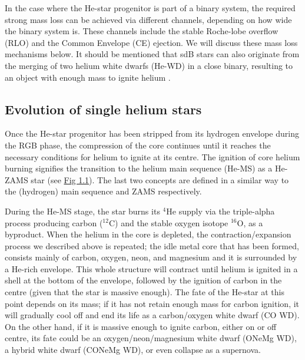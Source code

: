 \documentclass[../../main/thesis_msc.tex]{subfiles}
\begin{document}
				In the case where the He-star progenitor is part of a binary system, the required strong mass loss can be achieved via different channels, depending on how wide the binary system is. These channels include the stable Roche-lobe overflow (RLO) and the Common Envelope (CE) ejection. We will discuss these mass loss mechanisms below.
				It should be mentioned that sdB stars can also originate from the merging of two helium white dwarfs (He-WD) in a close binary, resulting to an object with enough mass to ignite helium \citep{Han2002}.
				
				
			
			\subsection{Evolution of single helium stars}
			
				Once the He-star progenitor has been stripped from its hydrogen envelope during the RGB phase, the compression of the core continues until it reaches the necessary conditions for helium to ignite at its centre. The ignition of core helium burning signifies the transition to the helium main sequence (He-MS) as a He-ZAMS star (see \hyperref[fig:T_rho_plane_ch1]{Fig 1.1}). The last two concepts are defined in a similar way to the (hydrogen) main sequence and ZAMS respectively.
				
				During the He-MS stage, the star burns its $^4$He supply via the triple-alpha process producing carbon ($^{12}$C) and the stable oxygen isotope $^{16}$O, as a byproduct. When the helium in the core is depleted, the contraction/expansion process we described above is repeated; the idle metal core that has been formed, consists mainly of carbon, oxygen, neon, and magnesium and it is surrounded by a He-rich envelope. This whole structure will contract until helium is ignited in a shell at the bottom of the envelope, followed by the ignition of carbon in the centre (given that the star is massive enough). The fate of the He-star at this point depends on its mass; if it has not retain enough mass for carbon ignition, it will gradually cool off and end its life as a carbon/oxygen white dwarf (CO WD). On the other hand, if it is massive enough to ignite carbon, either on or off centre, its fate could be an oxygen/neon/magnesium white dwarf (ONeMg WD), a hybrid white dwarf (CONeMg WD), or even collapse as a supernova.
				
\end{document}
